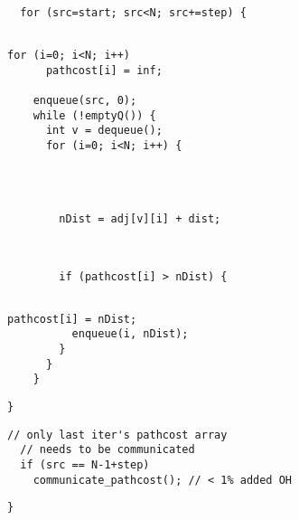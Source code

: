 \begin{lstlisting}[morekeywords={pathcost}, aboveskip=0pt,
belowskip=0pt, firstnumber=24,name=dij_checks,showlines=true]

  for (src=start; src<N; src+=step) {


\end{lstlisting}
\begin{lstlisting}[morekeywords={pathcost,dist}, aboveskip=0pt,
belowskip=0pt, firstnumber=28,name=dij_checks,showlines=true]
    for (i=0; i<N; i++)
      pathcost[i] = inf;

    enqueue(src, 0);
    while (!emptyQ()) {
      int v = dequeue();
      for (i=0; i<N; i++) {
\end{lstlisting}
\begin{lstlisting}[morekeywords={pathcost,dist,nDist}, aboveskip=0pt,
belowskip=0pt, firstnumber=auto,name=dij_checks,showlines=true]



        nDist = adj[v][i] + dist;
\end{lstlisting}
\begin{lstlisting}[morekeywords={pathcost}, aboveskip=0pt,
belowskip=0pt, firstnumber=auto,name=dij_checks,showlines=true]


        if (pathcost[i] > nDist) {


\end{lstlisting}
\begin{lstlisting}[morekeywords={pathcost}, aboveskip=0pt,
belowskip=0pt, firstnumber=auto,name=dij_checks]
          pathcost[i] = nDist;
          enqueue(i, nDist);
        }
      }
    }
\end{lstlisting}

\begin{lstlisting}[morekeywords={pathcost,dist}, aboveskip=0pt,
belowskip=0pt, firstnumber=auto,name=dij_checks,showlines=true]
  }
\end{lstlisting}

\begin{lstlisting}[morekeywords={pathcost},
aboveskip=0pt,belowskip=0pt,backgroundcolor=\color{lightgray},
firstnumber=auto, name=dij_checks,showlines=true]
  // only last iter's pathcost array
  // needs to be communicated
  if (src == N-1+step)
    communicate_pathcost(); // < 1% added OH
\end{lstlisting}

\begin{lstlisting}[morekeywords={pathcost}, aboveskip=0pt,
belowskip=0pt, firstnumber=auto,name=dij_checks]
}
\end{lstlisting}
